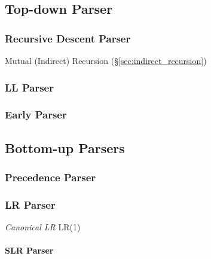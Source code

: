 \subsection{Top-down Parser}\label{sec:topdown_parser}

\subsubsection{Recursive Descent Parser}\label{sec:recursive_descent}

Mutual (Indirect) Recursion (\S\ref{sec:indirect_recursion})



\subsubsection{LL Parser}\label{sec:ll_parser}

\subsubsection{Early Parser}\label{sec:early_parser}



\subsection{Bottom-up Parsers}\label{sec:bottomup_parser}

\subsubsection{Precedence Parser}\label{sec:precedence_parser}

\subsubsection{LR Parser}\label{sec:lr_parser}

\emph{Canonical LR} LR(1)

\paragraph{SLR Parser}\label{sec:slr_parser}\hfill

